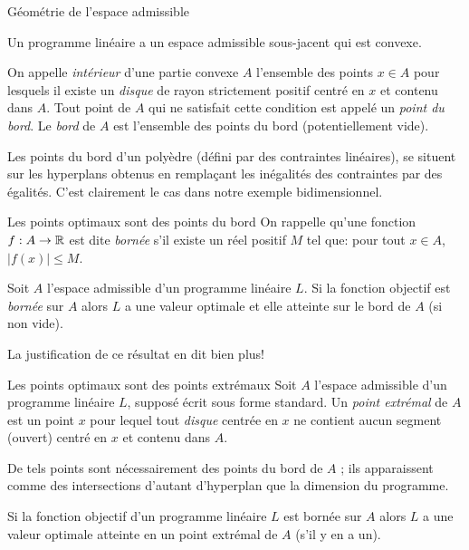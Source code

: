 \documentclass[aspectratio = 169]{beamer}
\begin{document}
\begin{frame}{Géométrie de l'espace admissible}
  \begin{prop}
    Un programme linéaire a un espace admissible sous-jacent qui est
    convexe.
  \end{prop}
  \begin{defn}
    On appelle \emph{intérieur} d'une partie convexe $A$ l'ensemble
    des points $x \in A$ pour lesquels il existe un \textit{disque} de
    rayon strictement positif centré en $x$ et contenu dans $A$. Tout
    point de $A$ qui ne satisfait cette condition est appelé un
    \emph{point du bord}. Le \emph{bord} de $A$ est l'ensemble des
    points du bord (potentiellement vide).
  \end{defn}
  Les points du bord d'un polyèdre (défini par des contraintes
  linéaires), se situent sur les hyperplans obtenus en rempla\c{c}ant
  les inégalités des contraintes par des égalités. C'est clairement le
  cas dans notre exemple bidimensionnel.
\end{frame}

\begin{frame}{Les points optimaux sont des points du bord}
  On rappelle qu'une fonction $f : A \to \mathbb{R}$ est dite \emph{bornée}
  s'il existe un réel positif $M$ tel que: pour tout $x \in A$,
  $\big|f(x)\big| \leq M$.
  \begin{prop}
    Soit $A$ l'espace admissible d'un programme linéaire $L$. Si la
    fonction objectif est \textit{bornée} sur $A$ alors $L$ a une
    valeur optimale et elle atteinte sur le bord de $A$ (si non vide).
  \end{prop}
  La justification de ce résultat en dit bien plus!
\end{frame}

\begin{frame}{Les points optimaux sont des points extrémaux}
  Soit $A$ l'espace admissible d'un programme linéaire $L$, supposé
  écrit sous forme standard. Un \emph{point extrémal} de $A$ est un
  point $x$ pour lequel tout \textit{disque} centrée en $x$ ne
  contient aucun segment (ouvert) centré en $x$ et contenu dans
  $A$. \pause

  De tels points sont nécessairement des points du bord de
  $A$ ; ils apparaissent comme des intersections d'autant d'hyperplan
  que la dimension du programme. \pause
  \begin{prop}
    Si la fonction objectif d'un programme linéaire $L$ est bornée sur
    $A$ alors $L$ a une valeur optimale atteinte en un point extrémal
    de $A$ (s'il y en a un).
    \end{prop}
\end{frame}
\end{document}
